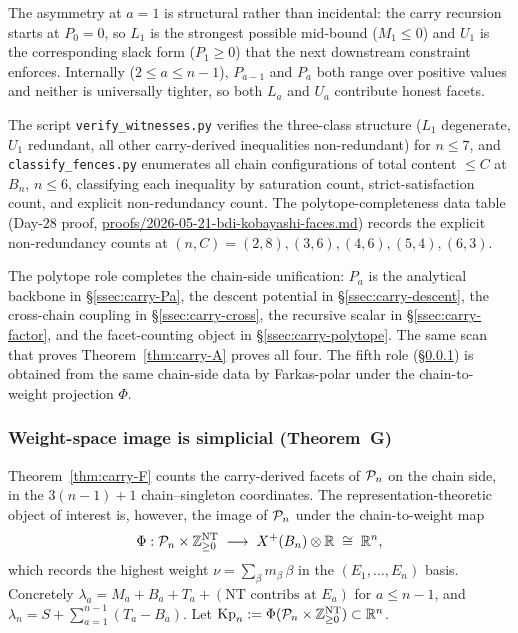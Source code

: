 \begin{remark}\label{rmk:boundary-asymmetry}
The asymmetry at $a = 1$ is structural rather than incidental: the carry
recursion starts at $P_0 = 0$, so $L_1$ is the strongest possible mid-bound
($M_1 \le 0$) and $U_1$ is the corresponding slack form ($P_1 \ge 0$) that the
next downstream constraint enforces. Internally ($2 \le a \le n-1$), $P_{a-1}$
and $P_a$ both range over positive values and neither is universally tighter,
so both $L_a$ and $U_a$ contribute honest facets.
\end{remark}

\begin{remark}\label{rmk:carry-F-verification}
The script \texttt{verify\_witnesses.py} verifies the three-class structure
($L_1$ degenerate, $U_1$ redundant, all other carry-derived inequalities
non-redundant) for $n \le 7$, and \texttt{classify\_fences.py} enumerates all
chain configurations of total content $\le C$ at $B_n$, $n \le 6$, classifying
each inequality by saturation count, strict-satisfaction count, and explicit
non-redundancy count. The polytope-completeness data table (Day-$28$ proof,
\url{proofs/2026-05-21-bdi-kobayashi-faces.md}) records the explicit
non-redundancy counts at $(n, C) = (2, 8), (3, 6), (4, 6), (5, 4), (6, 3)$.
\end{remark}

The polytope role completes the chain-side unification: $P_a$ is the analytical
backbone in \S\ref{ssec:carry-Pa}, the descent potential in
\S\ref{ssec:carry-descent}, the cross-chain coupling in
\S\ref{ssec:carry-cross}, the recursive scalar in \S\ref{ssec:carry-factor},
and the facet-counting object in \S\ref{ssec:carry-polytope}. The same scan
that proves Theorem~\ref{thm:carry-A} proves all four. The fifth role
(\S\ref{ssec:weight-simplicial}) is obtained from the same chain-side data by
Farkas-polar under the chain-to-weight projection $\Phi$.

\subsubsection{Weight-space image is simplicial (Theorem~G)}\label{ssec:weight-simplicial}

Theorem~\ref{thm:carry-F} counts the carry-derived facets of $\mathcal{P}_n$ on the
chain side, in the $3(n-1) + 1$ chain--singleton coordinates. The
representation-theoretic object of interest is, however, the image of $\mathcal{P}_n$
under the chain-to-weight map
\[
   \Phi : \mathcal{P}_n \times \mathbb{Z}_{\ge 0}^{\mathrm{NT}} \;\longrightarrow\; X^+(B_n) \otimes \mathbb{R}
   \;\cong\; \mathbb{R}^n,
\]
which records the highest weight $\nu = \sum_\beta m_\beta\,\beta$ in the
$(E_1, \dots, E_n)$ basis. Concretely $\lambda_a = M_a + B_a + T_a +
(\text{NT contribs at } E_a)$ for $a \le n - 1$, and
$\lambda_n = S + \sum_{a=1}^{n-1}(T_a - B_a)$. Let
$\mathrm{Kp}_n := \Phi(\mathcal{P}_n \times \mathbb{Z}_{\ge 0}^{\mathrm{NT}}) \subset \mathbb{R}^n$.

